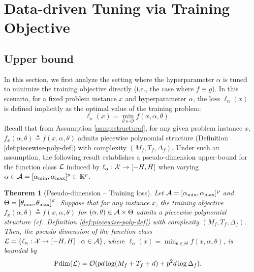 \documentclass{article}
\theoremstyle{plain}
\newtheorem{theorem}{Theorem}[section]
\theoremstyle{definition}
\theoremstyle{remark}
\begin{document}
\section{Data-driven Tuning via Training Objective} \label{sec:tuning-training}
\subsection{Upper bound}
In this section, we first analyze the setting where the hyperparameter $\alpha$ is tuned to minimize the training objective directly (i.e., the case where $f \equiv g$). In this scenario, for a fixed problem instance $x$ and hyperparameter $\alpha$, the loss $\ell_\alpha(x)$ is defined implicitly as the optimal value of the training problem:
\[
    \ell_\alpha(x) = \min_{\theta \in \Theta} f(x, \alpha, \theta).
\]
Recall that from Assumption \ref{asmp:structural}, for any given problem instance $x$, $f_x(\alpha, \theta) \triangleq f(x, \alpha, \theta)$ admits piecewise polynomial structure (Definition \ref{def:piecewise-poly-def}) with complexity $(M_f, T_f, \Delta_f)$. Under such an assumption, the following result establishes a pseudo-dimension upper-bound for the function class $\mathcal{L}$ induced by $\ell_\alpha: \mathcal{X} \rightarrow [-H, H]$ when varying $\alpha \in \mathcal{A} = [\alpha_{\textup{min}}, \alpha_\textup{max}]^p \subset \mathbb{R}^p$.
\begin{theorem}[Pseudo-dimension -- Training loss] \label{thm:pdim-tuning-training}
    Let $\mathcal{A} = [\alpha_\textup{min}, \alpha_\textup{max}]^p$ and $\Theta = [\theta_\textup{min}, \theta_\textup{max}]^d$. Suppose that for any instance $x$, the training objective $f_x(\alpha, \theta)\triangleq f(x, \alpha, \theta)$ for $(\alpha, \theta) \in \mathcal{A} \times \Theta$ admits a piecewise polynomial structure (cf.~Definition \ref{def:piecewise-poly-def}) with complexity $(M_f, T_f, \Delta_f)$. Then, the pseudo-dimension of the function class $\mathcal{L} = \{\ell_\alpha: \mathcal{X} \rightarrow [-H, H] \mid \alpha \in \mathcal{A}\}$, where $\ell_\alpha(x) = \min_{\theta \in \Theta} f(x, \alpha, \theta)$, is bounded by
    \[
        \text{\normalfont Pdim}(\mathcal{L}) = \mathcal{O}(pd\log(M_f + T_f + d) + p^2 d \log \Delta_f).
    \]
\end{theorem}
\end{document}
